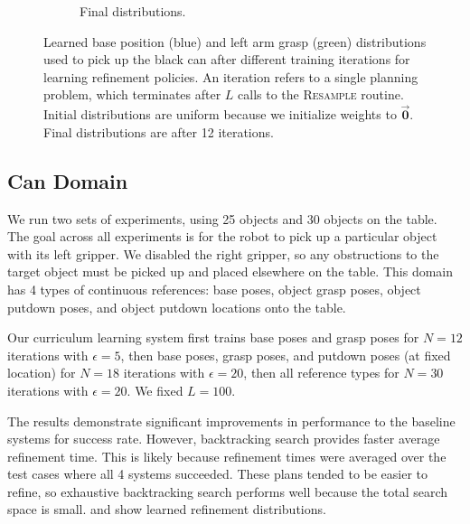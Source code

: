 \begin{figure}[t]
\begin{subfigure}[b]{0.35\linewidth}
    \caption{Final distributions.}
  \end{subfigure}
  \caption{\small{Learned base position (blue) and left arm grasp (green) distributions used to
pick up the black can after different training iterations for learning refinement policies.
An iteration refers to a single planning problem,
which terminates after $L$ calls to the \textsc{Resample} routine.
Initial distributions are uniform because we initialize weights to $\vec{\mathbf{0}}$.
Final distributions are after 12 iterations.}}
  \label{fig:training}
\end{figure}

\subsection{Can Domain}
We run two sets of experiments, using 25 objects and 30 objects on the table.
The goal across all experiments is for the robot to pick up a particular object with its
left gripper. We disabled the right gripper, so any obstructions to the target object must be picked up and
placed elsewhere on the table. This domain has 4 types of continuous references: base poses, object grasp
poses, object putdown poses, and object putdown locations onto the table.

Our curriculum learning system first trains base poses and grasp poses for $N = 12$ iterations with $\epsilon = 5$,
then base poses, grasp poses, and putdown poses (at fixed location) for $N = 18$ iterations with $\epsilon = 20$,
then all reference types for $N = 30$ iterations with $\epsilon = 20$. We fixed $L = 100$.

The results demonstrate significant improvements in performance to the baseline systems for success rate.
However, backtracking search provides faster average refinement time. This is likely because
refinement times were averaged over the test cases where all 4 systems succeeded. These plans tended
to be easier to refine, so exhaustive backtracking search performs well because the total search space is small.
 and  show learned refinement distributions.

